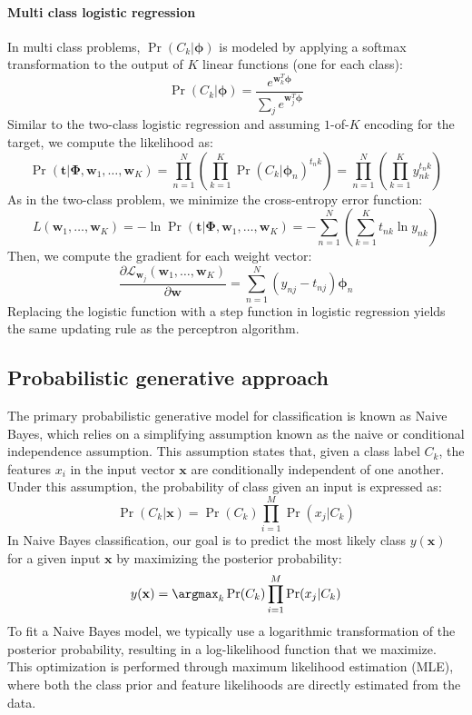 \paragraph*{Multi class logistic regression}
In multi class problems, $\Pr(C_k|\boldsymbol{\phi})$ is modeled by applying a softmax transformation to the output of $K$ linear functions (one for each class):
\[\Pr(C_k|\boldsymbol{\phi})=\dfrac{e^{\textbf{w}_k^T\boldsymbol{\phi}}}{\sum_j e^{\textbf{w}_j^T\boldsymbol{\phi}}}\]
Similar to the two-class logistic regression and assuming $1$-of-$K$  encoding for the target, we compute the likelihood as:
\[\Pr(\textbf{t}|\boldsymbol{\Phi},\textbf{w}_1,\dots,\textbf{w}_K)=\prod_{n=1}^N \left( \prod_{k=1}^K \Pr{(C_k|\boldsymbol{\phi}_n)}^{t_n k} \right)=\prod_{n=1}^N \left( \prod_{k=1}^K y^{t_n k}_{nk} \right)\]
As in the two-class problem, we minimize the cross-entropy error function:
\[L(\textbf{w}_1,\dots,\textbf{w}_K)=-\ln \Pr(\textbf{t}|\boldsymbol{\Phi},\textbf{w}_1,\dots,\textbf{w}_K)=-\sum_{n=1}^N \left(\sum_{k=1}^K t_{nk}\ln y_{nk} \right)\]
Then, we compute the gradient for each weight vector:
\[\dfrac{\partial\mathcal{L}_{\textbf{w}_j}(\textbf{w}_1,\dots,\textbf{w}_K)}{\partial\mathbf{w}} =\sum_{n=1}^N\left( y_{nj}-t_{nj} \right) \boldsymbol{\phi}_n\]
Replacing the logistic function with a step function in logistic regression yields the same updating rule as the perceptron algorithm.

\subsection{Probabilistic generative approach}
The primary probabilistic generative model for classification is known as Naive Bayes, which relies on a simplifying assumption known as the naive or conditional independence assumption. 
This assumption states that, given a class label $C_k$, the features $x_i$ in the input vector $\mathbf{x}$ are conditionally independent of one another.
Under this assumption, the probability of class given an input is expressed as: 
\[\Pr(C_k|\mathbf{x})=\Pr(C_k)\prod_{i=1}^M\Pr(x_j|C_k)\]
In Naive Bayes classification, our goal is to predict the most likely class $y(\mathbf{x})$ for a given input $\mathbf{x}$ by maximizing the posterior probability:
\[y(\mathbf{x})=\argmax_k\Pr(C_k)\prod_{i=1}^M\Pr(x_j|C_k)\]
To fit a Naive Bayes model, we typically use a logarithmic transformation of the posterior probability, resulting in a log-likelihood function that we maximize. 
This optimization is performed through maximum likelihood estimation (MLE), where both the class prior and feature likelihoods are directly estimated from the data.

